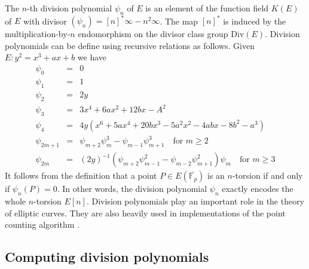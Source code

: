 \documentclass[12pt]{article}
\theoremstyle{plain}
\theoremstyle{definition}
\def\F{\ensuremath{\mathbb{F}}}
\begin{document}
The $n$-th division polynomial $\psi_n$ of $E$ is an element of the function field $K(E)$ of $E$ 
with divisor $(\psi_n) = [n]^*\infty - n^2\infty$. The map $[n]^*$ is induced by the 
multiplication-by-$n$ endomorphism on the divisor class group $\text{Div}(E)$. Division polynomials 
can be define using recursive relations as follows. Given $E: y^2 = x^3 + ax + b$ we have
\begin{equation}
\label{equ:divpoly1}
	\begin{array}{rll}
		\psi_0 & = & 0 \\
		\psi_1 & = & 1 \\
		\psi_2 & = & 2y \\
		\psi_3 & = & 3x^4 + 6ax^2 + 12bx - A^2 \\
		\psi_4 & = & 4y(x^6 + 5ax^4 + 20bx^3 - 5a^2x^2 - 4abx - 8b^2 - a^3) \\
		\psi_{2m + 1} & = & \psi_{m + 2}\psi_m^3 - \psi_{m - 1}\psi_{m + 1}^3 \quad \text{for } m 
		\ge 2 \\
		\psi_{2m} & = & (2y)^{-1}(\psi_{m + 2}\psi_{m - 1}^2 - \psi_{m - 2}\psi_{m + 1}^2)\psi_m 
		\quad \text{for } m \ge 3
	\end{array}
\end{equation}
It follows from the definition that a point $P \in E(\overline{\F_p})$ is an $n$-torsion if and 
only if $\psi_n(P) = 0$. In other words, the division polynomial $\psi_n$ exactly encodes the whole 
$n$-torsion $E[n]$. Division polynomials play an important role in the theory of elliptic 
curves. They are also heavily used in implementations of the point counting algorithm 
\cite{schoof85}. 


\subsection{Computing division polynomials}
\end{document}
